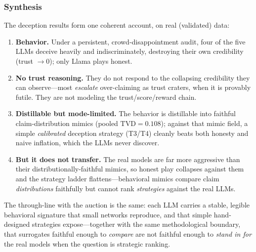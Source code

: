 \subsubsection{Synthesis}
The deception results form one coherent account, on real (validated) data:
\begin{enumerate}
\item \textbf{Behavior.} Under a persistent, crowd-disappointment audit, four of
the five LLMs deceive heavily and indiscriminately, destroying their own
credibility (trust $\to 0$); only Llama plays honest.
\item \textbf{No trust reasoning.} They do not respond to the collapsing
credibility they can observe---most \emph{escalate} over-claiming as trust
craters, when it is provably futile. They are not modeling the
trust/score/reward chain.
\item \textbf{Distillable but mode-limited.} The behavior is distillable into
faithful claim-distribution mimics (pooled $\mathrm{TVD}=0.108$); against that
mimic field, a simple \emph{calibrated} deception strategy (T3/T4) cleanly beats
both honesty and naive inflation, which the LLMs never discover.
\item \textbf{But it does not transfer.} The real models are far more aggressive
than their distributionally-faithful mimics, so honest play collapses against
them and the strategy ladder flattens---behavioral mimics compare claim
\emph{distributions} faithfully but cannot rank \emph{strategies} against the
real LLMs.
\end{enumerate}
The through-line with the auction is the same: each LLM carries a stable,
legible behavioral signature that small networks reproduce, and that simple
hand-designed strategies expose---together with the same methodological boundary,
that surrogates faithful enough to \emph{compare} are not faithful enough to
\emph{stand in for} the real models when the question is strategic ranking.
